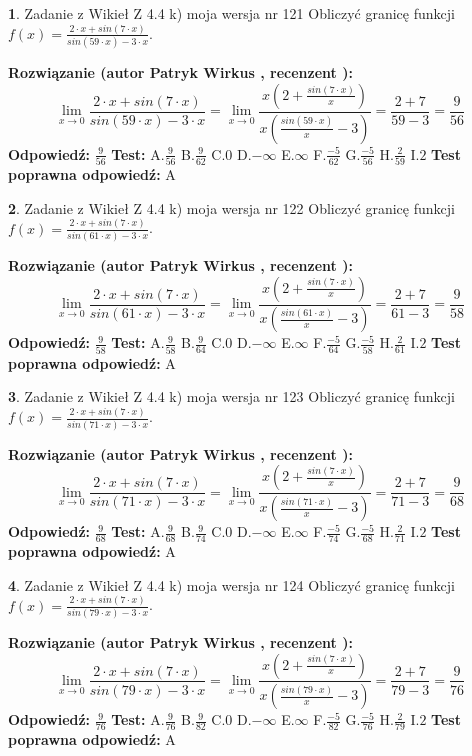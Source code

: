 \documentclass[12pt, a4paper]{article}
\theoremstyle{definition} %
\newtheorem{zad}{}
\newcommand{\zadStart}[1]{\begin{zad}#1\newline}
\newcommand{\zadStop}{\end{zad}}
\newcommand{\rozwStart}[2]{\noindent \textbf{Rozwiązanie (autor #1 , recenzent #2): }\newline}
\newcommand{\rozwStop}{\newline}
\newcommand{\odpStart}{\noindent \textbf{Odpowiedź:}\newline}
\newcommand{\odpStop}{\newline}
\newcommand{\testStart}{\noindent \textbf{Test:}\newline}
\newcommand{\testStop}{\newline}
\newcommand{\kluczStart}{\noindent \textbf{Test poprawna odpowiedź:}\newline}
\newcommand{\kluczStop}{\newline}
\begin{document}
\zadStart{Zadanie z Wikieł Z 4.4 k) moja wersja nr 121}
Obliczyć granicę funkcji $f(x)=\frac{2\cdot x +sin(7\cdot x)}{sin(59\cdot x) -3\cdot x}$.
\zadStop
\rozwStart{Patryk Wirkus}{}
$$\lim\limits_{x\to 0}\frac{2\cdot x +sin(7\cdot x)}{sin(59\cdot x) -3\cdot x}
=\lim\limits_{x\to 0}\frac{x(2+\frac{sin(7\cdot x)}{x})}{x(\frac{sin(59\cdot x)}{x}-3)}
=\frac{2+7}{59-3} = \frac{9}{56}$$
\rozwStop
\odpStart
$\frac{9}{56}$
\odpStop
\testStart
A.$\frac{9}{56}$
B.$\frac{9}{62}$
C.$0$
D.$-\infty$
E.$\infty$
F.$\frac{-5}{62}$
G.$\frac{-5}{56}$
H.$\frac{2}{59}$
I.$2$
\testStop
\kluczStart
A
\kluczStop



\zadStart{Zadanie z Wikieł Z 4.4 k) moja wersja nr 122}
Obliczyć granicę funkcji $f(x)=\frac{2\cdot x +sin(7\cdot x)}{sin(61\cdot x) -3\cdot x}$.
\zadStop
\rozwStart{Patryk Wirkus}{}
$$\lim\limits_{x\to 0}\frac{2\cdot x +sin(7\cdot x)}{sin(61\cdot x) -3\cdot x}
=\lim\limits_{x\to 0}\frac{x(2+\frac{sin(7\cdot x)}{x})}{x(\frac{sin(61\cdot x)}{x}-3)}
=\frac{2+7}{61-3} = \frac{9}{58}$$
\rozwStop
\odpStart
$\frac{9}{58}$
\odpStop
\testStart
A.$\frac{9}{58}$
B.$\frac{9}{64}$
C.$0$
D.$-\infty$
E.$\infty$
F.$\frac{-5}{64}$
G.$\frac{-5}{58}$
H.$\frac{2}{61}$
I.$2$
\testStop
\kluczStart
A
\kluczStop



\zadStart{Zadanie z Wikieł Z 4.4 k) moja wersja nr 123}
Obliczyć granicę funkcji $f(x)=\frac{2\cdot x +sin(7\cdot x)}{sin(71\cdot x) -3\cdot x}$.
\zadStop
\rozwStart{Patryk Wirkus}{}
$$\lim\limits_{x\to 0}\frac{2\cdot x +sin(7\cdot x)}{sin(71\cdot x) -3\cdot x}
=\lim\limits_{x\to 0}\frac{x(2+\frac{sin(7\cdot x)}{x})}{x(\frac{sin(71\cdot x)}{x}-3)}
=\frac{2+7}{71-3} = \frac{9}{68}$$
\rozwStop
\odpStart
$\frac{9}{68}$
\odpStop
\testStart
A.$\frac{9}{68}$
B.$\frac{9}{74}$
C.$0$
D.$-\infty$
E.$\infty$
F.$\frac{-5}{74}$
G.$\frac{-5}{68}$
H.$\frac{2}{71}$
I.$2$
\testStop
\kluczStart
A
\kluczStop



\zadStart{Zadanie z Wikieł Z 4.4 k) moja wersja nr 124}
Obliczyć granicę funkcji $f(x)=\frac{2\cdot x +sin(7\cdot x)}{sin(79\cdot x) -3\cdot x}$.
\zadStop
\rozwStart{Patryk Wirkus}{}
$$\lim\limits_{x\to 0}\frac{2\cdot x +sin(7\cdot x)}{sin(79\cdot x) -3\cdot x}
=\lim\limits_{x\to 0}\frac{x(2+\frac{sin(7\cdot x)}{x})}{x(\frac{sin(79\cdot x)}{x}-3)}
=\frac{2+7}{79-3} = \frac{9}{76}$$
\rozwStop
\odpStart
$\frac{9}{76}$
\odpStop
\testStart
A.$\frac{9}{76}$
B.$\frac{9}{82}$
C.$0$
D.$-\infty$
E.$\infty$
F.$\frac{-5}{82}$
G.$\frac{-5}{76}$
H.$\frac{2}{79}$
I.$2$
\testStop
\kluczStart
A
\kluczStop
\end{document}
